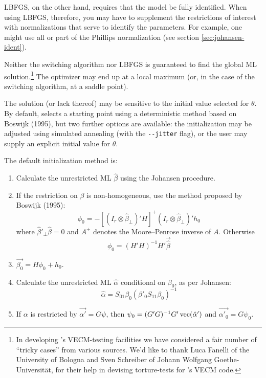 LBFGS, on the other hand, requires that the model be fully identified.
When using LBFGS, therefore, you may have to supplement the
restrictions of interest with normalizations that serve to identify
the parameters.  For example, one might use all or part of the
Phillips normalization (see section \ref{sec:johansen-ident}).

Neither the switching algorithm nor LBFGS is guaranteed to find the
global ML solution.\footnote{In developing 's VECM-testing
  facilities we have considered a fair number of ``tricky cases'' from
  various sources. We'd like to thank Luca Fanelli of the University
  of Bologna and Sven Schreiber of Johann Wolfgang Goethe-Universit\"at,
  for their help in devising torture-tests for 's VECM
  code.} The optimizer may end up at a local maximum (or, in the case
of the switching algorithm, at a saddle point).

The solution (or lack thereof) may be sensitive to the initial value
selected for $\theta$.  By default,  selects a starting
point using a deterministic method based on Boswijk (1995), but two
further options are available: the initialization may be adjusted
using simulated annealing (with the \verb+--jitter+ flag), or the user
may supply an explicit initial value for $\theta$.

The default initialization method is:
%
\begin{enumerate}
\item Calculate the unrestricted ML $\hat{\beta}$ using the
  Johansen procedure.
\item If the restriction on $\beta$ is non-homogeneous, use the
  method proposed by Boswijk (1995):
\begin{equation}
\phi_0 = -[(I_r \otimes \hat{\beta}_{\perp})'H]^+ 
  (I_r \otimes \hat{\beta}_{\perp})' h_0
\end{equation}
where $\hat{\beta}'_{\perp} \hat{\beta} = 0$ and $A^+$ denotes
the Moore--Penrose inverse of $A$.  Otherwise
\begin{equation}
\phi_0 = (H'H)^{-1} H' \vec{\hat{\beta}}
\end{equation}
\item $\vec{\beta_0} = H\phi_0 + h_0$.
\item Calculate the unrestricted ML $\hat{\alpha}$ conditional on
  $\beta_0$, as per Johansen:
\begin{equation}
\label{eq:Jalpha}
\hat{\alpha} = S_{01} \beta_0 (\beta'_0S_{11}\beta_0)^{-1}
\end{equation}
\item If $\alpha$ is restricted by $\vec{\alpha'} = G\psi$, then
  $\psi_0 = (G'G)^{-1}G'\,{\rm vec}(\hat{\alpha}')$ and
  $\vec{\alpha'_0} = G\psi_0$.
\end{enumerate}

